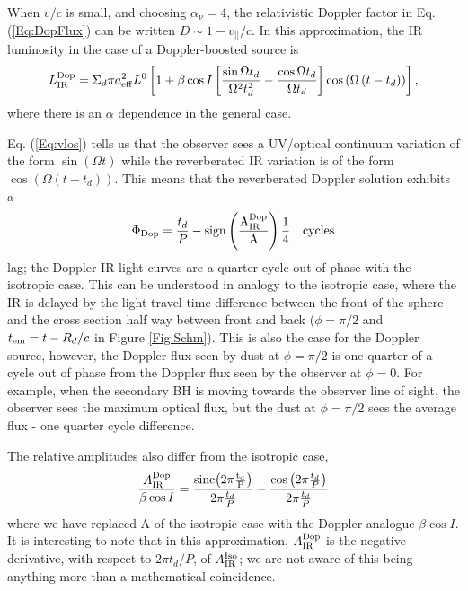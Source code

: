 When $v/c$ is small, and choosing $\alpha_{\nu}=4$, the relativistic Doppler
factor in Eq. (\ref{Eq:DopFlux}) can be written $D \sim 1 - v_{||}/c$. In this
approximation, the IR luminosity in the case of a Doppler-boosted source is
\begin{equation}
L^{\rm{Dop}}_{\rm{IR}} =  \Sigma_d \pi  a^2_{\eff} L^0 \left[ 
  1 +  \beta \cos{I} \left[ \frac{ \sin{\Omega t_d} }{\Omega^2 t^2_d} - 
  \frac{\cos{\Omega t_d}}{\Omega t_d}\right] \cos\left( \Omega \left( t - t_d\right)\right)
   \right],
   \label{Eq:LIR_Dop_sp}
\end{equation}
where there is an $\alpha$ dependence in the general case. 




Eq. (\ref{Eq:vlos}) tells us that the observer sees a UV/optical continuum
variation of the form $\sin\left( \Omega t\right)$ while the reverberated IR
variation is of the form $\cos\left( \Omega \left( t - t_d\right)\right)$.
This means that the reverberated Doppler solution exhibits a 
\begin{equation}
\Phi_{\rm{Dop}} = \frac{t_d}{P} - \rm{sign}\left(\frac{A^{\rm{Dop}}_{\rm{IR}}}{A} \right) \frac{1}{4} \quad \rm{cycles}
\label{Eq:DOPLags}
\end{equation}
lag; the Doppler IR light curves are a quarter cycle out of phase
with the isotropic case. This can be understood in analogy
to the isotropic case, where the IR is delayed by the light travel time
difference between the front of the sphere and the cross section half way
between front and back ($\phi = \pi/2$ and  $t_{\em} = t-R_d/c$ in
Figure \ref{Fig:Schm}). This is also the case for the Doppler source, however,
the Doppler flux seen by dust at $\phi = \pi/2$ is one quarter of a cycle
out of phase from the Doppler flux seen by the observer at $\phi = 0$. For
example, when the secondary BH is moving towards the observer line of
sight, the observer sees the maximum optical flux, but the dust at $\phi =
\pi/2$ sees the average flux - one quarter cycle difference.

 

The relative amplitudes also differ from the isotropic case,
\begin{equation}
\frac{A^{\rm{Dop}}_{\rm{IR}}}{\beta \cos{I}}  =  \frac{ \rm{sinc}{ \left( 2 \pi \frac{t_d}{P} \right)  }    }{2 \pi \frac{t_d}{P}}
 -   \frac{\cos{ \left(2 \pi \frac{t_d}{P}  \right) } }{ 2 \pi \frac{t_d}{P} }
  \label{Eq:DopAIR_sp}
\end{equation}
 where we have replaced A of the isotropic case with the Doppler analogue $\beta \cos{I}$. It is interesting to note that in this approximation, $A^{\rm{Dop}}_{\rm{IR}}$ is the negative derivative, with respect to $2 \pi t_d/P$, of $A^{\rm{Iso}}_{\rm{IR}}$; we are not aware of this being anything more than a mathematical coincidence.


